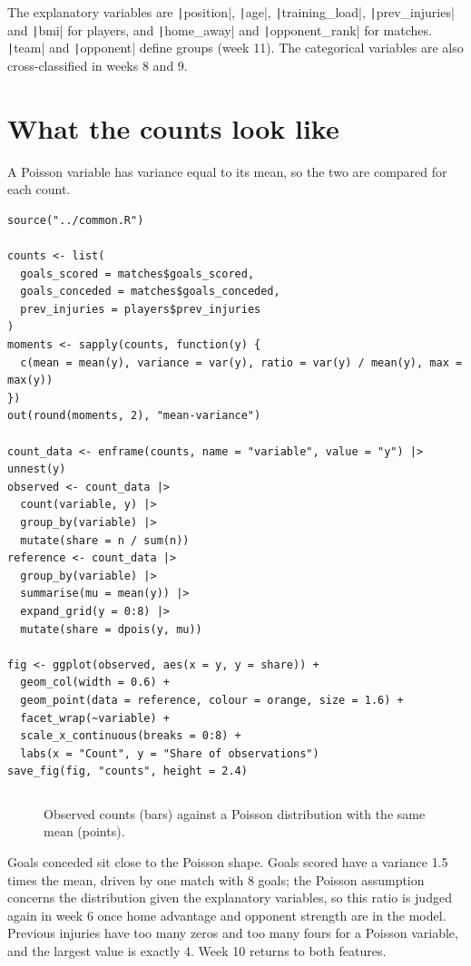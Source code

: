 \documentclass[12pt,notitlepage]{report}
\begin{document}
The explanatory variables are \texttt|position|, \texttt|age|,
\texttt|training_load|, \texttt|prev_injuries| and
\texttt|bmi| for players, and \texttt|home_away| and
\texttt|opponent_rank| for matches. \texttt|team| and
\texttt|opponent| define groups (week 11). The categorical variables
are also cross-classified in weeks 8 and 9.

\section{What the counts look like}

A Poisson variable has variance equal to its mean, so the two are compared
for each count.

\begin{verbatim}
source("../common.R")

counts <- list(
  goals_scored = matches$goals_scored,
  goals_conceded = matches$goals_conceded,
  prev_injuries = players$prev_injuries
)
moments <- sapply(counts, function(y) {
  c(mean = mean(y), variance = var(y), ratio = var(y) / mean(y), max = max(y))
})
out(round(moments, 2), "mean-variance")

count_data <- enframe(counts, name = "variable", value = "y") |> unnest(y)
observed <- count_data |>
  count(variable, y) |>
  group_by(variable) |>
  mutate(share = n / sum(n))
reference <- count_data |>
  group_by(variable) |>
  summarise(mu = mean(y)) |>
  expand_grid(y = 0:8) |>
  mutate(share = dpois(y, mu))

fig <- ggplot(observed, aes(x = y, y = share)) +
  geom_col(width = 0.6) +
  geom_point(data = reference, colour = orange, size = 1.6) +
  facet_wrap(~variable) +
  scale_x_continuous(breaks = 0:8) +
  labs(x = "Count", y = "Share of observations")
save_fig(fig, "counts", height = 2.4)
\end{verbatim}

\inputminted{text}{output/mean-variance.txt}

\begin{figure}[H]
  \centering
  \caption{Observed counts (bars) against a Poisson distribution with the
    same mean (points).}
  \label{fig:counts}
\end{figure}

Goals conceded sit close to the Poisson shape. Goals scored have a variance
1.5 times the mean, driven by one match with 8 goals; the Poisson assumption
concerns the distribution given the explanatory variables, so this ratio is
judged again in week 6 once home advantage and opponent strength are in the
model. Previous injuries have too many zeros and too many fours for a Poisson
variable, and the largest value is exactly 4. Week 10 returns to both
features.
\end{document}
